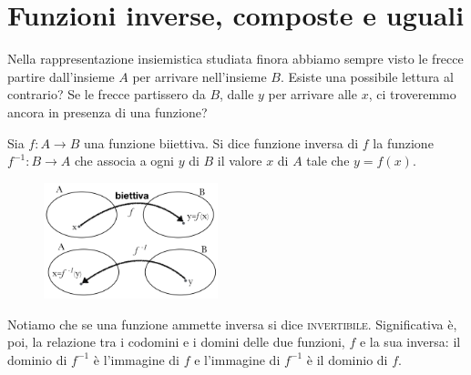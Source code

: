 \section{Funzioni inverse, composte e uguali}
Nella rappresentazione insiemistica studiata finora abbiamo sempre visto le 
frecce partire dall'insieme $A$ per arrivare nell'insieme $B$. Esiste una 
possibile lettura al contrario? Se le frecce partissero da $B$, dalle $y$ per 
arrivare alle $x$, ci troveremmo ancora in presenza di una funzione?

\begin{definizione}
Sia $f : A\to B$ una funzione biiettiva. Si dice funzione inversa di $f$ la 
funzione $f^{-1} : B\to A$ che associa a ogni $y$ di $B$ il valore $x$ di $A$ 
tale che $y=f(x)$.
\end{definizione}

\begin{figure}[htpb!]
  \centering
  \includegraphics[width=0.45\textwidth]{img/funz_12.png} 
\end{figure}

Notiamo che se una funzione ammette inversa si dice \textsc{invertibile}. 
Significativa è, poi, la relazione tra i codomini e i domini delle due 
funzioni, $f$ e la sua inversa: il dominio di $f^{-1}$ è l'immagine di $f$ e 
l'immagine di $f^{-1}$ è il dominio di $f$.\\

